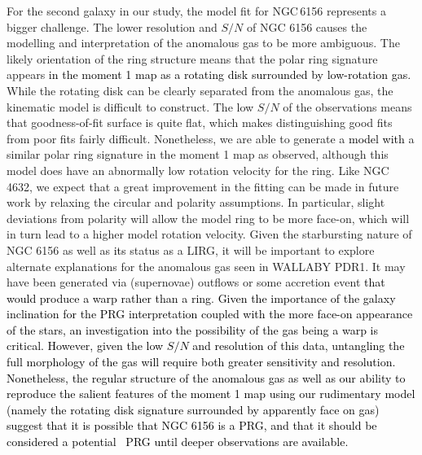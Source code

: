 \documentclass[fleqn,usenatbib]{mnras}
\newcommand{\hi}{\text{H\,\sc{i}}}
\begin{document}
For the second galaxy in our study, the model fit for NGC\,6156 represents a bigger challenge.   The lower resolution and $S/N$ of NGC 6156 causes the modelling and interpretation of the anomalous gas to be more ambiguous.
The likely orientation of the ring structure means that the polar ring signature appears \textcolor{black}{in the moment 1 map as a rotating disk surrounded by low-rotation gas.}  While the rotating disk can be clearly separated from the anomalous gas, the kinematic model is difficult to construct.  The low $S/N$ of the observations means that goodness-of-fit surface is quite flat, which makes distinguishing good fits from poor fits fairly difficult.  Nonetheless, we are able to generate a \textcolor{black}{model with} a similar polar ring signature in the moment 1 map as observed, although this model does have an abnormally low rotation velocity for the ring.  Like NGC 4632, we expect that a great improvement in the fitting can be made in future work by relaxing the circular and polarity assumptions.  In particular, slight deviations from polarity will allow the model ring to be more face-on, which will in turn lead to a higher model rotation velocity.  Given the starbursting nature of NGC 6156 as well as \textcolor{black}{its} status as a LIRG, it will be important to explore alternate explanations for the anomalous gas seen in WALLABY PDR1.  It may have been generated via (supernovae) outflows or some accretion event \textcolor{black}{that would produce a warp rather than a ring}.  \textcolor{black}{Given the importance of the galaxy inclination for the PRG interpretation coupled with the more face-on appearance of the stars, an investigation into the possibility of the gas being a warp is critical.  However, given the low $S/N$ and resolution of this data, untangling the full morphology of the gas will require both greater sensitivity and resolution.  Nonetheless, the regular structure of the anomalous gas as well as our ability to reproduce the salient features of the moment 1 map using our rudimentary model (namely the rotating disk signature surrounded by apparently face on gas) suggest that it is possible that NGC 6156 is a PRG, and that it should be considered a \textcolor{black}{potential \hi\ PRG} until deeper observations are available.}

\end{document}
